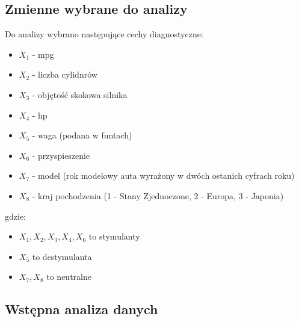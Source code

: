 \documentclass{article}
\begin{document}
    \subsection{Zmienne wybrane do analizy} %
    Do analizy wybrano następujące cechy diagnostyczne:
    \begin{itemize}
        \item ${X_1}$ - mpg
        \item ${X_2}$ - liczba cylidnrów 
        \item ${X_3}$ - objętość skokowa silnika
        \item ${X_4}$ - hp
        \item ${X_5}$ - waga (podana w funtach)
        \item ${X_6}$ - przyspieszenie
        \item ${X_7}$ - model (rok modelowy auta wyrażony w dwóch ostanich cyfrach roku)
        \item ${X_8}$ - kraj pochodzenia (1 - Stany Zjednoczone, 2 - Europa, 3 - Japonia)
    \end{itemize}
    gdzie:
    \begin{itemize}
        \item ${X_1, X_2, X_3, X_4, X_6}$ to stymulanty
        \item ${X_5}$ to destymulanta
        \item ${X_7, X_8}$ to neutralne
    \end{itemize}
    
    
    \subsection{Wstępna analiza danych}
\end{document}
